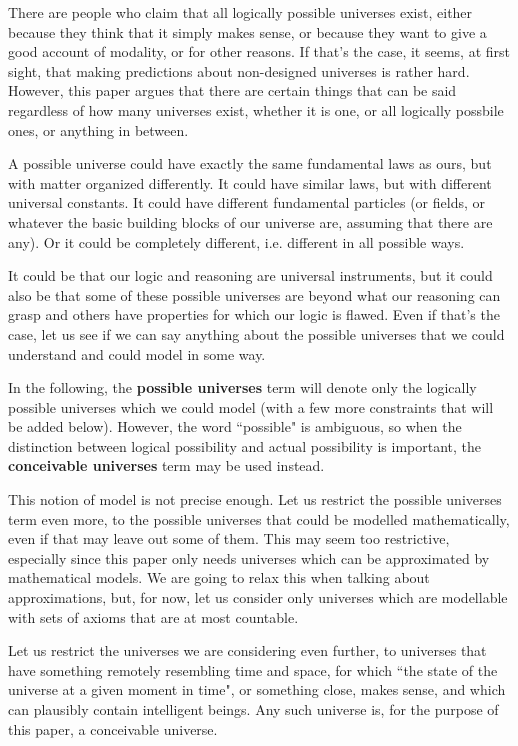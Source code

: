 \documentclass[a4paper
]{article}
\newcommand{\paper}[1]{paper}
\newcommand{\definitie}[1]{\textbf{#1}}
\newcommand{\ghilimele}[1]{``#1"}
\begin{document}
There are people who claim that all logically possible universes exist,
either because they think that it simply makes sense, or because they want to
give a good account of modality, or for other reasons.
If that's the case, it seems, at first sight, that making predictions about
non-designed universes is rather hard.
However, this \paper{} argues that there are certain things that can be said
regardless of how many universes exist, whether it is one, or all logically
possbile ones, or anything in between.

A possible universe
could have exactly the same fundamental laws as ours, but with matter
organized differently.
It could have similar laws, but with different universal constants.
It could have different fundamental particles (or fields, or whatever the basic
building blocks of our universe are, assuming that there are any).
Or it could be completely different, i.e. different in all possible ways.

It could be that our logic and reasoning are universal instruments,
but it could also be that some of these possible universes are
beyond what our reasoning can grasp and others have properties
for which our logic is flawed.
Even if that's the case, let us see if we can say anything about
the possible universes that we could understand and could model in some way.

In the following, the \definitie{possible universes} term will denote
only the logically possible universes which we could model (with a few
more constraints that will be added below). However, the word
\ghilimele{possible} is ambiguous, so when the distinction between logical
possibility and actual possibility is important, the
\definitie{conceivable universes} term may be used instead.

This notion of model is not precise enough.
Let us restrict the possible universes term even more,
to the possible universes that could be modelled mathematically,
even if that may leave out some of them.
This may seem too restrictive,
especially since this paper only needs universes which can be approximated
by mathematical models.
We are going to relax this when talking about approximations, but, for now,
let us consider only universes
which are modellable with sets of axioms that are at most countable.

Let us restrict the universes we are considering even further, to universes that
have something remotely resembling time and space, for which
\ghilimele{the state of the universe at a given moment in time}, or something
close, makes sense, and which can plausibly contain intelligent beings.
Any such universe is, for the purpose of this paper, a conceivable universe.
\end{document}
